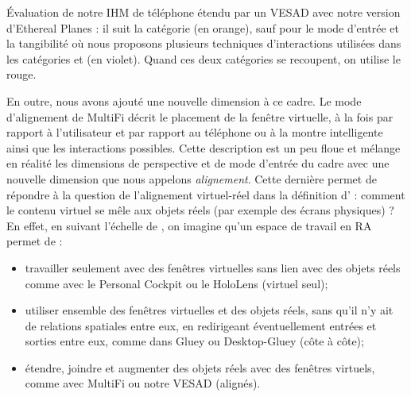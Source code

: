 {%
}{
  Évaluation de notre IHM de téléphone étendu par un VESAD avec notre version d'Ethereal Planes : il suit la catégorie  (en orange), sauf pour le mode d'entrée et la tangibilité où nous proposons plusieurs techniques d'interactions utilisées dans les catégories  et  (en violet). Quand ces deux catégories se recoupent, on utilise le rouge.
}

En outre, nous avons ajouté une nouvelle dimension à ce cadre. Le mode d'alignement de MultiFi \citep{Grubert2015} décrit le placement de la fenêtre virtuelle, à la fois par rapport à l'utilisateur et par rapport au téléphone ou à la montre intelligente ainsi que les interactions possibles. Cette description est un peu floue et mélange en réalité les dimensions de perspective et de mode d'entrée du cadre avec une nouvelle dimension que nous appelons \emph{alignement}. Cette dernière permet de répondre à la question de l'alignement virtuel-réel dans la définition d'\cite{Azuma1997} : comment le contenu virtuel se mêle aux objets réels (par exemple des écrans physiques) ? En effet, en suivant l'échelle de \cite{Milgram1994}, on imagine qu'un espace de travail en RA permet de :
\begin{itemize}
  \item travailler seulement avec des fenêtres virtuelles sans lien avec des objets réels comme avec le Personal Cockpit ou le HoloLens (virtuel seul);
  \item utiliser ensemble des fenêtres virtuelles et des objets réels, sans qu'il n'y ait de relations spatiales entre eux, en redirigeant éventuellement entrées et sorties entre eux, comme dans Gluey ou Desktop-Gluey (côte à côte);
  \item étendre, joindre et augmenter des objets réels avec des fenêtres virtuels, comme avec MultiFi ou notre VESAD (alignés).
\end{itemize}
\medskip

